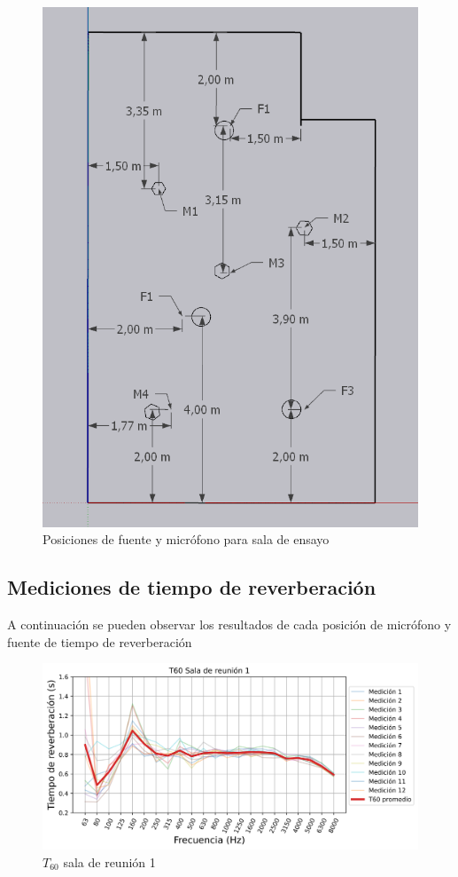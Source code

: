 \begin{figure}[H]
    \centering
    \includegraphics[scale=0.4]{Imagenes/PosicionesRT/Posiciones Sala OCV.png}
    \caption{Posiciones de fuente y micrófono para sala de ensayo}
    \label{fig: posiciones sala OCV}
\end{figure}

\subsection{Mediciones de tiempo de reverberación} \label{subseccc: mediciones tiempo de reverberación}
A continuación se pueden observar los resultados de cada posición de micrófono y fuente de tiempo de reverberación
\begin{figure}[H]
    \centering
    \includegraphics[width=12cm]{Imagenes/Resultados/T60_Sala_reunion_1.png}
    \caption{$T_{60}$ sala de reunión 1}
    \label{fig: T60 sala1}
\end{figure}

